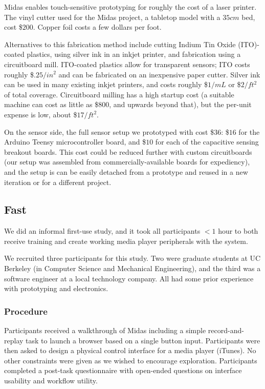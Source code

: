     Midas enables touch-sensitive prototyping for roughly the cost of a laser printer. The vinyl cutter used for the Midas project, a tabletop model with a $35cm$ bed, cost \$$200$. Copper foil costs a few dollars per foot.
    
    Alternatives to this fabrication method include cutting Indium Tin Oxide (ITO)-coated plastics, using silver ink in an inkjet printer, and fabrication using a circuitboard mill. ITO-coated plastics allow for transparent sensors; ITO costs roughly \$$.25/in^2$ and can be fabricated on an inexpensive paper cutter. Silver ink can be used in many existing inkjet printers, and costs roughly \$$1/mL$ or \$$2/ft^2$ of total coverage. Circuitboard milling has a high startup cost (a suitable machine can cost as little as \$$800$, and upwards beyond that), but the per-unit expense is low, about \$$17/ft^2$.
    
    On the sensor side, the full sensor setup we prototyped with cost \$$36$: \$$16$ for the Arduino Teensy microcontroller board, and \$$10$ for each of the capacitive sensing breakout boards. This cost could be reduced further with custom circuitboards (our setup was assembled from commercially-available boards for expediency), and the setup is can be easily detached from a prototype and reused in a new iteration or for a different project.
    
    \subsection{Fast}
    
    We did an informal first-use study, and it took all participants $<1$ hour to both receive training and create working media player peripherals with the system.
    
    We recruited three participants for this study. Two were graduate students at UC Berkeley (in Computer Science and Mechanical Engineering), and the third was a software engineer at a local technology company. All had some prior experience with prototyping and electronics.

        \subsubsection{Procedure}
Participants received a walkthrough of Midas including a simple record-and-replay task to launch a browser based on a single button input. Participants were then asked to design a physical control interface for a media player (iTunes). No other constraints were given as we wished to encourage exploration. Participants completed a post-task questionnaire with open-ended questions on interface usability and workflow utility.

